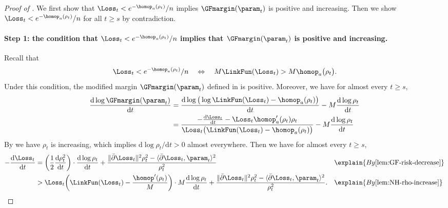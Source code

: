 \begin{proof}[Proof of ]
We first show that $\Loss_t < e^{-\homop_a(\rho_t)}/n$ implies $\GFmargin(\param_t)$ is positive and increasing. Then we show $\Loss_t < e^{-\homop_a(\rho_t)}/n$ for all $t\ge s$ by contradiction. 

\paragraph{Step 1: the condition that $\Loss_t < e^{-\homop_a(\rho_t)}/n$ implies that $\GFmargin(\param_t)$ is positive and  increasing.}
Recall that
\begin{equation*}
    \Loss_t < e^{-\homop_a(\rho_t)}/n \quad 
    \Leftrightarrow \quad 
    M \LinkFun(\Loss_t)  >   M \homop_a \big(\rho_t \big).
\end{equation*}
Under this condition, the modified margin $\GFmargin(\param_t)$ defined in  is positive. 
Moreover, we have for almost every $t \ge s$, 
\begin{align*}
    \frac{\mathrm{d} \log \GFmargin(\param_t)}{\mathrm{d} t} 
    &= \frac{\mathrm{d} \log\big(\log \LinkFun(\Loss_t) - \homop_a(\rho_t)\big)}{\mathrm{d} t} - M \frac{\mathrm{d} \log \rho_t}{\mathrm{d} t}\\ 
    &= \frac{-\frac{\mathrm{d} \Loss_t}{\mathrm{d} t}  - \Loss_t \homop_a^\prime (\rho_t)  \rho_t}{\Loss_t \big(\LinkFun(\Loss_t) - \homop_a(\rho_t)\big)} - M \frac{\mathrm{d} \log \rho_t}{\mathrm{d} t}
\end{align*}
By  we have $\rho_t$ is increasing, which implies $\mathrm{d}  \log \rho_t / \mathrm{d} t >0$ almost everywhere.  
Then we have for almost every $t\ge s$,
\begin{align*}
        -  \frac{\mathrm{d} \Loss_t}{\mathrm{d} t}  
        &= \bigg(\frac{1}{2} \frac{\mathrm{d} \rho_t^2}{\mathrm{d}  t} \bigg) \cdot \frac{\mathrm{d}  \log \rho_t}{\mathrm{d}  t} + \frac{\| \bar \partial \Loss_t \|^2 \rho_t^2 - \langle  \bar \partial \Loss_t , \param_t \rangle^2 }{\rho_t^2} && \explain{By \Cref{lem:GF-risk-decrease}}\\
        &>\Loss_t \bigg(   \LinkFun(\Loss_t) - \frac{\homop^{\prime}(\rho_t)}{M}  \bigg) \cdot M\frac{\mathrm{d} \log \rho_t}{\mathrm{d} t}  + \frac{\|\bar \partial \Loss_t\|^2 \rho_t^2 - \langle \bar \partial \Loss_t, \param_t \rangle^2 }{\rho_t^2}. && \explain{By \Cref{lem:NH-rho-increase}}

\end{align*}
\end{proof}

